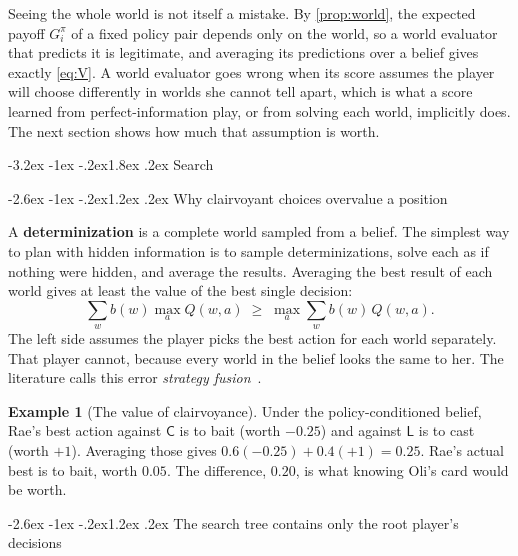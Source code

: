 \documentclass[11pt,a4paper]{article}
\makeatletter
\renewcommand\section{\@startsection{section}{1}{\z@}
  {-3.2ex \@plus -1ex \@minus -.2ex}{1.8ex \@plus .2ex}
  {\normalfont\Large\sffamily\bfseries\color{ink}}}
\renewcommand\subsection{\@startsection{subsection}{2}{\z@}
  {-2.6ex \@plus -1ex \@minus -.2ex}{1.2ex \@plus .2ex}
  {\normalfont\large\sffamily\bfseries\color{ink}}}
\theoremstyle{plain}
\theoremstyle{definition}
\newtheorem{example}{Example}
\newcommand{\term}[1]{\textbf{#1}}
\newcommand{\Cs}{\mathsf C}
\newcommand{\Ld}{\mathsf L}
\makeatother
\begin{document}
Seeing the whole world is not itself a mistake. By \cref{prop:world}, the
expected payoff $G_i^{\pi}$ of a fixed policy pair depends only on the world,
so a world evaluator that predicts it is legitimate, and averaging its
predictions over a belief gives exactly \cref{eq:V}. A world evaluator goes
wrong when its score assumes the player will choose differently in worlds she
cannot tell apart, which is what a score learned from perfect-information
play, or from solving each world, implicitly does. The next section shows how
much that assumption is worth.

\section{Search}
\label{sec:search}

\subsection{Why clairvoyant choices overvalue a position}

A \term{determinization} is a complete world sampled from a belief. The
simplest way to plan with hidden information is to sample determinizations,
solve each as if nothing were hidden, and average the results. Averaging the best result of each world gives at least the value
of the best single decision:
\begin{equation}
\sum_{w} b(w)\max_{a} Q(w,a)\;\ge\;\max_{a}\sum_{w} b(w)\,Q(w,a).
\label{eq:fusion}
\end{equation}
The left side assumes the player picks the best action for each world
separately. That player cannot, because every world in the belief looks the
same to her. The literature calls this error \emph{strategy
fusion}~\cite{frank1998,long2010}.

\begin{example}[The value of clairvoyance]
\label{ex:fusion}
Under the policy-conditioned belief, Rae's best action against $\Cs$ is to
bait (worth $-0.25$) and against $\Ld$ is to cast (worth $+1$). Averaging
those gives $0.6(-0.25)+0.4(+1)=0.25$. Rae's actual best is to bait, worth
$0.05$. The difference, $0.20$, is what knowing Oli's card would be worth.
\end{example}

\subsection{The search tree contains only the root player's decisions}
\end{document}
